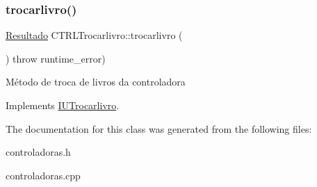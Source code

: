 \subsubsection{\texorpdfstring{trocarlivro()}{trocarlivro()}}
{\footnotesize\ttfamily \hyperlink{classResultado}{Resultado} C\+T\+R\+L\+Trocarlivro\+::trocarlivro (\begin{DoxyParamCaption}{ }\end{DoxyParamCaption}) throw  runtime\+\_\+error) \hspace{0.3cm}{\ttfamily [virtual]}}

Método de troca de livros da controladora 

Implements \hyperlink{classIUTrocarlivro}{I\+U\+Trocarlivro}.



The documentation for this class was generated from the following files\+:\begin{DoxyCompactItemize}
\item 
controladoras.\+h\item 
controladoras.\+cpp\end{DoxyCompactItemize}
